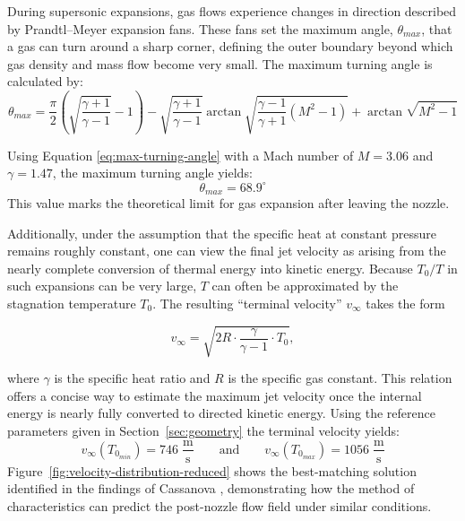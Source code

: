 		During supersonic expansions, gas flows experience changes in direction described by Prandtl–Meyer expansion fans.
		These fans set the maximum angle, $\theta_{max}$, that a gas can turn around a sharp corner, defining the outer boundary beyond which gas density and mass flow become very small.
		The maximum turning angle is calculated by:
		\begin{equation}
			\theta_{max} = \frac{\pi}{2} \left(\sqrt{\frac{\gamma + 1}{\gamma - 1}} - 1\right) - \sqrt{\frac{\gamma + 1}{\gamma - 1}}\arctan{\sqrt{\frac{\gamma - 1}{\gamma + 1}(M^2 - 1)}} + \arctan{\sqrt{M^2 -1}}
			\label{eq:max-turning-angle}
		\end{equation}

		Using Equation \eqref{eq:max-turning-angle} with a Mach number of $M=3.06$ and $\gamma=1.47$, the maximum turning angle yields:
		$$
			\theta_{max} = 68.9^\circ
		$$
		This value marks the theoretical limit for gas expansion after leaving the nozzle.

		Additionally, under the assumption that the specific heat at constant pressure remains roughly constant, one can view the final jet velocity as arising from the nearly complete conversion of thermal energy into kinetic energy.
		Because $T_0 / T$ in such expansions can be very large, $T$ can often be approximated by the stagnation temperature $T_0$.
		The resulting “terminal velocity” $v_{\infty}$ takes the form

		\begin{equation}
			v_{\infty} = \sqrt{2R \cdot \frac{\gamma}{\gamma - 1} \cdot T_0},
		\end{equation}

		where $\gamma$ is the specific heat ratio and $R$ is the specific gas constant. This relation offers a concise way to estimate the maximum jet velocity once the internal energy is nearly fully converted to directed kinetic energy.
		Using the reference parameters given in Section~\ref{sec:geometry} the terminal velocity yields:
		$$
			v_\infty(T_{0_{min}}) = 746 \; \frac{\text{m}}{\text{s}}
				\qquad \text{and} \qquad
			v_\infty(T_{0_{max}}) = 1056 \; \frac{\text{m}}{\text{s}}
		$$
		Figure~\ref{fig:velocity-distribution-reduced} shows the best-matching solution identified in the findings of Cassanova \cite{Cassanova1965}, demonstrating how the method of characteristics can predict the post-nozzle flow field under similar conditions.

